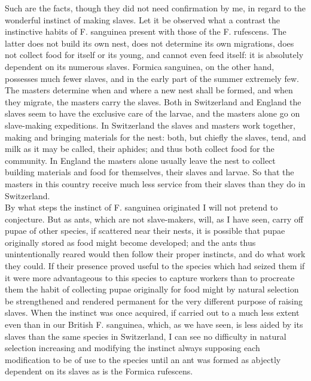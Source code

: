 \indent Such are the facts, though they did not need confirmation by me, in regard to the wonderful instinct of making slaves.  Let it be observed what a contrast the instinctive habits of F. sanguinea present with those of the F. rufescens.  The latter does not build its own nest, does not determine its own migrations, does not collect food for itself or its young, and cannot even feed itself: it is absolutely dependent on its numerous slaves.  Formica sanguinea, on the other hand, possesses much fewer slaves, and in the early part of the summer extremely few.  The masters determine when and where a new nest shall be formed, and when they migrate, the masters carry the slaves.  Both in Switzerland and England the slaves seem to have the exclusive care of the larvae, and the masters alone go on slave-making expeditions. In Switzerland the slaves and masters work together, making and bringing materials for the nest: both, but chiefly the slaves, tend, and milk as it may be called, their aphides; and thus both collect food for the community. In England the masters alone usually leave the nest to collect building materials and food for themselves, their slaves and larvae. So that the masters in this country receive much less service from their slaves than they do in Switzerland.\\
\indent By what steps the instinct of F. sanguinea originated I will not pretend to conjecture. But as ants, which are not slave-makers, will, as I have seen, carry off pupae of other species, if scattered near their nests, it is possible that pupae originally stored as food might become developed; and the ants thus unintentionally reared would then follow their proper instincts, and do what work they could. If their presence proved useful to the species which had seized them if it were more advantageous to this species to capture workers than to procreate them the habit of collecting pupae originally for food might by natural selection be strengthened and rendered permanent for the very different purpose of raising slaves. When the instinct was once acquired, if carried out to a much less extent even than in our British F. sanguinea, which, as we have seen, is less aided by its slaves than the same species in Switzerland, I can see no difficulty in natural selection increasing and modifying the instinct always supposing each modification to be of use to the species until an ant was formed as abjectly dependent on its slaves as is the Formica rufescens.\\
